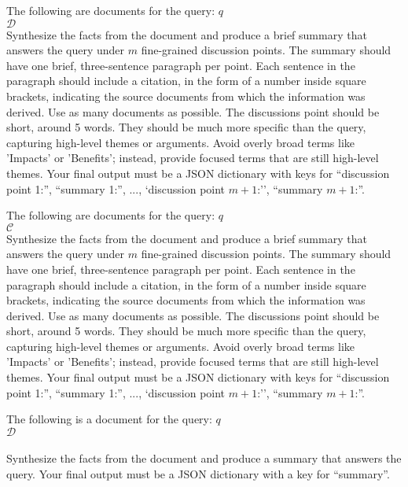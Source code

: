 \begin{prompt}[title={Prompt \thetcbcounter: Long-Context Summarization Prompt (\cref{subsection:summary})}, label=prompt:lc]
The following are documents for the query: $q$\\
$\mathcal{D}$\\
Synthesize the facts from the document and produce a brief summary that answers the query under $m$ fine-grained discussion points. The summary should have one brief, three-sentence paragraph per point. Each sentence in the paragraph should include a citation, in the form of a number inside square brackets, indicating the source documents from which the information was derived. Use as many documents as possible. The discussions point should be short, around 5 words. They should be much more specific than the query, capturing high-level themes or arguments. Avoid overly broad terms like 'Impacts' or 'Benefits'; instead, provide focused terms that are still high-level themes. Your final output must be a JSON dictionary with keys for ``discussion point 1:'', ``summary 1:'', ..., `discussion point $m+1$:'', ``summary $m+1$:''.
\end{prompt}

\clearpage

\begin{prompt}[title={Prompt \thetcbcounter: RAG Summarization Prompt (\cref{subsection:summary})}, label=prompt:rag]
The following are documents for the query: $q$\\
$\mathcal{C}$\\
Synthesize the facts from the document and produce a brief summary that answers the query under $m$ fine-grained discussion points. The summary should have one brief, three-sentence paragraph per point. Each sentence in the paragraph should include a citation, in the form of a number inside square brackets, indicating the source documents from which the information was derived. Use as many documents as possible. The discussions point should be short, around 5 words. They should be much more specific than the query, capturing high-level themes or arguments. Avoid overly broad terms like 'Impacts' or 'Benefits'; instead, provide focused terms that are still high-level themes. Your final output must be a JSON dictionary with keys for ``discussion point 1:'', ``summary 1:'', ..., `discussion point $m+1$:'', ``summary $m+1$:''.
\end{prompt}

\begin{prompt}[title={Prompt \thetcbcounter: Hierarchical Summarization Prompt (Intermediate Summary) (\cref{subsection:summary})}, label=prompt:h1]
The following is a document for the query: $q$\\
$\mathcal{D}$\\
\\
Synthesize the facts from the document and produce a summary that answers the query. Your final output must be a JSON dictionary with a key for ``summary''.
\end{prompt}

